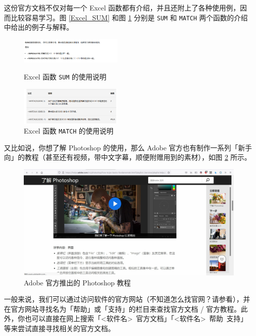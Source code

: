 这份官方文档不仅对每一个 Excel 函数都有介绍，并且还附上了各种使用例，因而比较容易学习。图 \ref{Excel_SUM} 和图 \ref{Excel_MATCH} 分别是 \verb|SUM| 和 \verb|MATCH| 两个函数的介绍中给出的例子与解释。

\begin{figure}[htbp]
  \centering
  \begin{minipage}{6cm}
    \centering
    \includegraphics[width=5cm]{assets/Excel_SUM.png}
    \caption{Excel 函数 \texttt{SUM} 的使用说明}
    \label{Excel_SUM}
  \end{minipage}
  \qquad
  \begin{minipage}{6cm}
    \centering
    \includegraphics[width=5cm]{assets/Excel_MATCH.png}
    \caption{Excel 函数 \texttt{MATCH} 的使用说明}
    \label{Excel_MATCH}
  \end{minipage}
\end{figure}

又比如说，你想了解 Photoshop 的使用，那么 Adobe 官方也有制作一系列「新手向」的教程（甚至还有视频，带中文字幕，顺便附赠用到的素材），如图 \ref{PS_official_tutorial} 所示。

\begin{figure}[htb!]
  \centering
  \includegraphics[width=12cm]{assets/PS_official_tutorial.jpg}
  \caption{Adobe 官方推出的 Photoshop 教程}
  \label{PS_official_tutorial}
\end{figure}

一般来说，我们可以通过访问软件的官方网站（不知道怎么找官网？请参看），并在官方网站寻找名为「帮助」或「支持」的栏目来查找官方文档 / 官方教程。此外，你也可以直接在网上搜索「<软件名>\ 官方文档」「<软件名>\ 帮助\ 支持」等来尝试直接寻找相关的官方文档。


